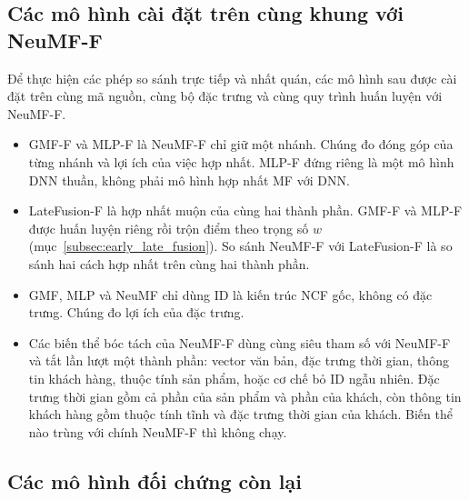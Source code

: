 \subsection{Các mô hình cài đặt trên cùng khung với NeuMF-F}
\label{subsec:early_fusion_design}

Để thực hiện các phép so sánh trực tiếp và nhất quán, các mô hình sau được cài đặt trên cùng mã nguồn, cùng bộ đặc trưng và cùng quy trình huấn luyện với NeuMF-F.
\begin{itemize}
    \item GMF-F và MLP-F là NeuMF-F chỉ giữ một nhánh. Chúng đo đóng góp của từng nhánh và lợi ích của việc hợp nhất. MLP-F đứng riêng là một mô hình DNN thuần, không phải mô hình hợp nhất MF với DNN.
    \item LateFusion-F là hợp nhất muộn của cùng hai thành phần. GMF-F và MLP-F được huấn luyện riêng rồi trộn điểm theo trọng số $w$ (mục~\ref{subsec:early_late_fusion}). So sánh NeuMF-F với LateFusion-F là so sánh hai cách hợp nhất trên cùng hai thành phần.
    \item GMF, MLP và NeuMF chỉ dùng ID là kiến trúc NCF gốc, không có đặc trưng. Chúng đo lợi ích của đặc trưng.
    \item Các biến thể bóc tách của NeuMF-F dùng cùng siêu tham số với NeuMF-F và tắt lần lượt một thành phần: vector văn bản, đặc trưng thời gian, thông tin khách hàng, thuộc tính sản phẩm, hoặc cơ chế bỏ ID ngẫu nhiên. Đặc trưng thời gian gồm cả phần của sản phẩm và phần của khách, còn thông tin khách hàng gồm thuộc tính tĩnh và đặc trưng thời gian của khách. Biến thể nào trùng với chính NeuMF-F thì không chạy.
\end{itemize}

\subsection{Các mô hình đối chứng còn lại}
\label{subsec:other_baselines}


